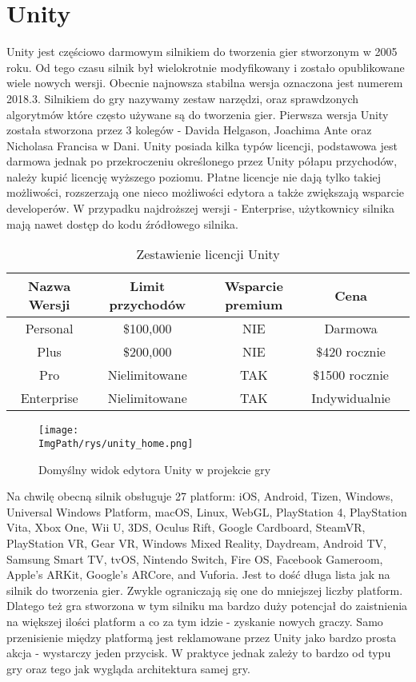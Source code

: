 \documentclass[a4paper,12pt,twoside,openany]{report}
\newcommand{\ImgPath}{.}
\begin{document}
\section{Unity}
Unity jest częściowo darmowym silnikiem do tworzenia gier stworzonym w 2005 roku. Od tego czasu silnik był wielokrotnie modyfikowany i zostało opublikowane wiele nowych wersji. Obecnie najnowsza stabilna wersja oznaczona jest numerem 2018.3\cite{unity_wiki}. Silnikiem do gry nazywamy zestaw narzędzi, oraz sprawdzonych algorytmów które często używane są do tworzenia gier. Pierwsza wersja Unity została stworzona przez 3 kolegów - Davida Helgason, Joachima Ante oraz Nicholasa Francisa w Dani. Unity posiada kilka typów licencji, podstawowa jest darmowa jednak po przekroczeniu określonego przez Unity półapu przychodów, należy kupić licencję wyższego poziomu. Płatne licencje nie dają tylko takiej możliwości, rozszerzają one nieco możliwości edytora a także zwiększają wsparcie developerów. W przypadku najdroższej wersji - Enterprise, użytkownicy silnika mają nawet dostęp do kodu źródłowego silnika.

\begin{table}[h!]
\centering
\begin{tabular}{c|cccc}
Nazwa Wersji & Limit przychodów & Wsparcie premium & Cena \\ \hline
Personal & \$100,000 & NIE & Darmowa \\
Plus & \$200,000 & NIE & \$420 rocznie \\
Pro & Nielimitowane & TAK & \$1500 rocznie \\
Enterprise & Nielimitowane & TAK & Indywidualnie \\
\end{tabular}
\caption{Zestawienie licencji Unity}
\label{table_unity_versions}
\end{table}

\begin{figure}[!htbp]
	\begin{center}
\centering
\texttt{[image: \\ImgPath/rys/unity\_home.png]}
\end{center}
	\caption{Domyślny widok edytora Unity w projekcie gry}
	\label{unity_home}
\end{figure}

Na chwilę obecną silnik obsługuje 27 platform: iOS, Android, Tizen, Windows, Universal Windows Platform, macOS, Linux, WebGL, PlayStation 4, PlayStation Vita, Xbox One, Wii U, 3DS, Oculus Rift, Google Cardboard, SteamVR, PlayStation VR, Gear VR, Windows Mixed Reality, Daydream, Android TV, Samsung Smart TV, tvOS, Nintendo Switch, Fire OS, Facebook Gameroom, Apple's ARKit, Google's ARCore, and Vuforia. Jest to dość długa lista jak na silnik do tworzenia gier. Zwykle ograniczają się one do mniejszej liczby platform. Dlatego też gra stworzona w tym silniku ma bardzo duży potencjał do zaistnienia na większej ilości platform a co za tym idzie - zyskanie nowych graczy. Samo przenisienie między platformą jest reklamowane przez Unity jako bardzo prosta akcja - wystarczy jeden przycisk. W praktyce jednak zależy to bardzo od typu gry oraz tego jak wygląda architektura samej gry.
\end{document}
